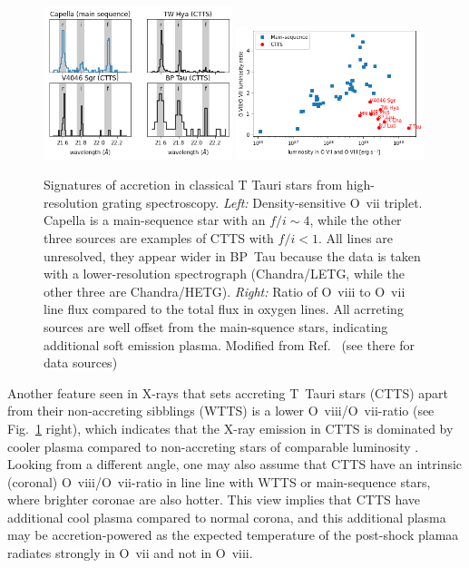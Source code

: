 \begin{figure}[t]
\centering
\includegraphics[width=0.49\textwidth]{figs/o7f2i.png}
\includegraphics[width=0.49\textwidth]{figs/o72o8.png}
\caption{Signatures of accretion in classical T Tauri stars from high-resolution grating spectroscopy. \emph{Left:} Density-sensitive O~{\sc vii} triplet. Capella is a main-sequence star with an $f/i\sim 4$, while the other three sources are examples of CTTS with $f/i < 1$. All lines are unresolved, they appear wider in BP~Tau because the data is taken with a lower-resolution spectrograph (Chandra/LETG, while the other three are Chandra/HETG). \emph{Right:} Ratio of O~{\sc viii} to O~{\sc vii} line flux compared to the total flux in oxygen lines. All acrreting sources are well offset from the main-squence stars, indicating additional soft emission plasma. Modified from Ref.~ \cite{2013ApJ...771...70G} (see there for data sources) \label{fig:softexcess}}
\end{figure}


Another feature seen in X-rays that sets accreting T~Tauri stars (CTTS) apart from their non-accreting sibblings (WTTS) is a lower O~{\sc viii}/O~{\sc vii}-ratio (see Fig.~\ref{fig:softexcess} right), which indicates that the X-ray emission in CTTS is dominated by cooler plasma compared to non-accreting stars of comparable luminosity \cite{2007A&A...473..229R,2007A&A...474L..25G}. 
Looking from a different angle, one may also assume that CTTS have an intrinsic (coronal) O~{\sc viii}/O~{\sc vii}-ratio  in line line with WTTS or main-sequence stars, where brighter coronae are also hotter. This view implies that CTTS have additional cool plasma compared to normal corona, and this additional plasma may be accretion-powered as the expected temperature of the post-shock plamaa radiates strongly in O~{\sc vii} and not in O~{\sc viii}.

